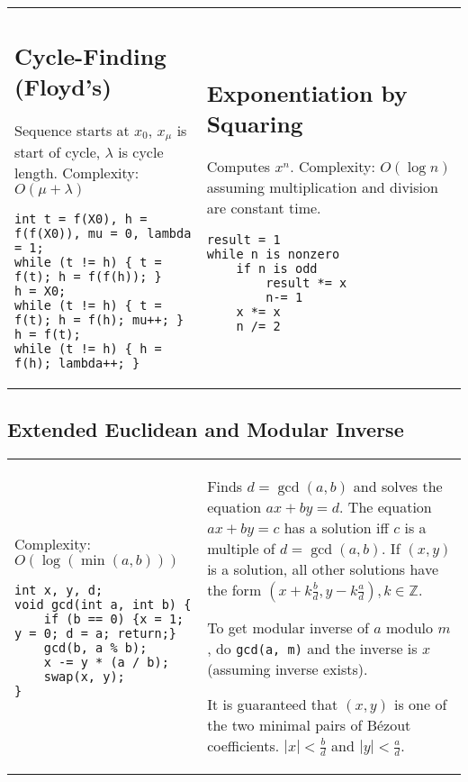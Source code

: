 \documentclass[letterpaper]{article}
\begin{document}
\begin{tabular}{@{}p{9cm}p{9cm}@{}}
    \subsection{Cycle-Finding (Floyd's)}

    Sequence starts at $x_0$, $x_\mu$ is start of cycle, $\lambda$ is cycle length. Complexity: $O\left(\mu+\lambda\right)$

    \begin{lstlisting}
int t = f(X0), h = f(f(X0)), mu = 0, lambda = 1;
while (t != h) { t = f(t); h = f(f(h)); }
h = X0;
while (t != h) { t = f(t); h = f(h); mu++; }
h = f(t);
while (t != h) { h = f(h); lambda++; }
\end{lstlisting}
     &
    \subsection{Exponentiation by Squaring}

    Computes $x^n$. Complexity: $O\left(\log n\right)$ assuming multiplication and division are constant time.

    \begin{lstlisting}
result = 1
while n is nonzero
	if n is odd
		result *= x
		n-= 1
	x *= x
	n /= 2
\end{lstlisting}
\end{tabular}

\subsection{Extended Euclidean and Modular Inverse}

\begin{tabular}{@{}p{9cm}p{9cm}@{}}
    Complexity: $O\left(\log\left(\min\left(a,b\right)\right)\right)$

    \begin{lstlisting}
int x, y, d;
void gcd(int a, int b) {
	if (b == 0) {x = 1; y = 0; d = a; return;}
	gcd(b, a % b);
	x -= y * (a / b);
	swap(x, y);
}
\end{lstlisting}
     &
    Finds $d=\gcd(a,b)$ and solves the equation $ax+by=d$. The equation $ax+by=c$ has a solution iff $c$ is a multiple of $d=\gcd(a,b)$. If $(x,y)$ is a solution, all other solutions have the form $(x + k\frac bd, y - k\frac ad), k\in\mathbb Z$.

    To get modular inverse of $a$ modulo $m$, do \texttt{gcd(a, m)} and the inverse is $x$ (assuming inverse exists).

    It is guaranteed that $(x,y)$ is one of the two minimal pairs of B\'ezout coefficients. $|x|<\frac{b}{d}$ and $|y|<\frac{a}{d}$.
\end{tabular}
\end{document}
